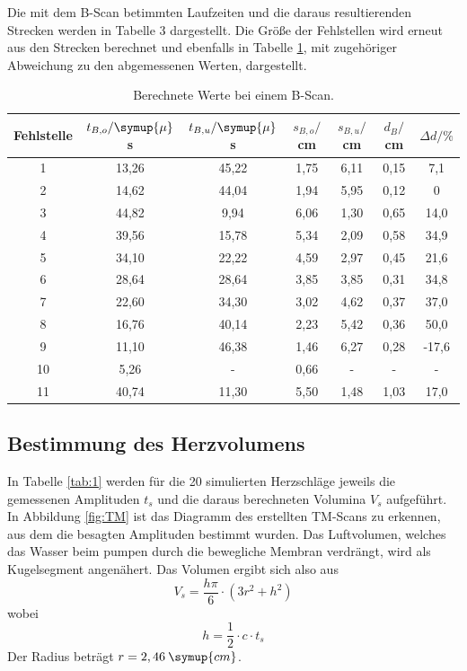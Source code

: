 Die mit dem B-Scan betimmten Laufzeiten und die daraus resultierenden Strecken werden in Tabelle 3 dargestellt.
Die Größe der Fehlstellen wird erneut aus den Strecken berechnet und ebenfalls in Tabelle \ref{tab:2}, mit zugehöriger Abweichung
zu den abgemessenen Werten, dargestellt.

\begin{table}[H]
  \centering
  \caption{Berechnete Werte bei einem B-Scan.}
  \label{tab:2}
  \begin{tabular}{c c c c c c c}
    \toprule
  Fehlstelle & $t_{B,o}/\symup{\mu}$s & $t_{B,u}/ \symup{\mu}$s  & $s_{B,o}/$cm & $s_{B,u}/$cm & $d_B/$cm & $\Delta d/ \%$\\
    \midrule
    1  & 13,26 &  45,22 & 1,75 & 6,11  & 0,15 & 7,1      \\
    2  & 14,62 &  44,04 & 1,94 & 5,95  & 0,12 & 0  \\
    3  & 44,82 &  9,94  & 6,06 & 1,30  & 0,65 & 14,0  \\
    4  & 39,56 &  15,78 & 5,34 & 2,09  & 0,58 & 34,9  \\
    5  & 34,10 &  22,22 & 4,59 & 2,97  & 0,45 & 21,6   \\
    6  & 28,64 &  28,64 & 3,85 & 3,85  & 0,31 & 34,8   \\
    7  & 22,60 &  34,30 & 3,02 & 4,62  & 0,37 & 37,0   \\
    8  & 16,76 &  40,14 & 2,23 & 5,42  & 0,36 & 50,0    \\
    9  & 11,10 &  46,38 & 1,46 & 6,27  & 0,28 & -17,6    \\
    10 & 5,26  &  -     &  0,66 & -    & -    &  -      \\
    11 & 40,74 &  11,30 &  5,50 & 1,48 & 1,03 & 17,0   \\
    \bottomrule
  \end{tabular}
\end{table}



\subsection{Bestimmung des Herzvolumens}
In Tabelle \ref{tab:1} werden für die 20 simulierten Herzschläge jeweils die gemessenen Amplituden $t_s$ und die daraus berechneten
Volumina $V_s$ aufgeführt. In Abbildung \ref{fig:TM} ist das Diagramm des erstellten TM-Scans zu erkennen, aus dem die besagten Amplituden
bestimmt wurden. Das Luftvolumen, welches das Wasser beim pumpen durch die bewegliche Membran verdrängt, wird als
Kugelsegment angenähert. Das Volumen ergibt sich also aus
\begin{equation*}
  V_s = \frac{h\pi}{6}\cdot(3r^2 + h^2)
\end{equation*}
wobei
\begin{equation*}
  h = \frac{1}{2}\cdot c \cdot t_s
\end{equation*}
Der Radius beträgt $r = 2,46 \: \symup{cm}$.

